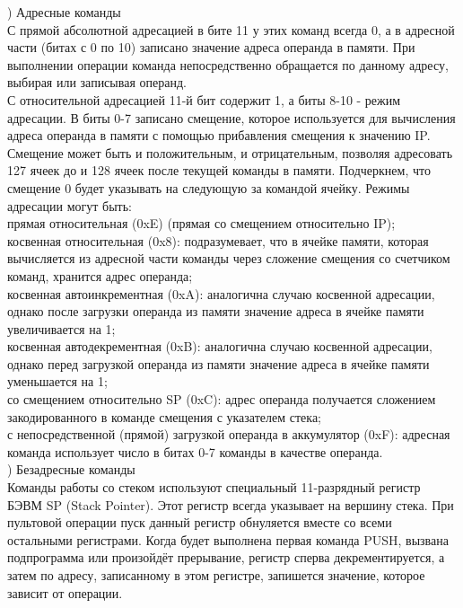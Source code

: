 ) Адресные команды \\
С прямой абсолютной адресацией в бите 11 у этих команд всегда 0, а в адресной части (битах с 0 по 10) записано значение адреса операнда в памяти. При выполнении операции команда непосредственно обращается по данному адресу, выбирая или записывая операнд. \\
С относительной адресацией 11-й бит содержит 1, а биты 8-10 - режим адресации. В биты 0-7 записано смещение, которое используется для вычисления адреса операнда в памяти с помощью прибавления смещения к значению IP. Смещение может быть и положительным, и отрицательным, позволяя адресовать 127 ячеек до и 128 ячеек после текущей команды в памяти. Подчеркнем, что смещение 0 будет указывать на следующую за командой ячейку. Режимы адресации могут быть: \\
прямая относительная (0xE) (прямая со смещением относительно IP); \\
косвенная относительная (0x8): подразумевает, что в
ячейке памяти, которая вычисляется из адресной части команды через сложение смещения со счетчиком команд, хранится адрес операнда; \\
косвенная автоинкрементная (0xA): аналогична случаю
косвенной адресации, однако после загрузки операнда из памяти значение адреса в ячейке памяти увеличивается на 1; \\
косвенная автодекрементная (0xB): аналогична случаю
косвенной адресации, однако перед загрузкой операнда из памяти значение адреса в ячейке памяти уменьшается на 1; \\
со смещением относительно SP (0xC): адрес операнда получается сложением закодированного в команде смещения с указателем стека; \\
с непосредственной (прямой) загрузкой операнда в аккумулятор (0xF): адресная команда использует число в битах 0-7 команды в качестве операнда. \\

) Безадресные команды \\
Команды работы со стеком используют специальный 11-разрядный регистр БЭВМ SP (Stack Pointer). Этот регистр всегда указывает на вершину стека. При пультовой операции пуск данный регистр обнуляется вместе со всеми остальными регистрами. Когда будет выполнена первая команда PUSH, вызвана подпрограмма или произойдёт прерывание, регистр сперва декрементируется, а затем по адресу, записанному в этом регистре, запишется значение, которое зависит от операции. \\

